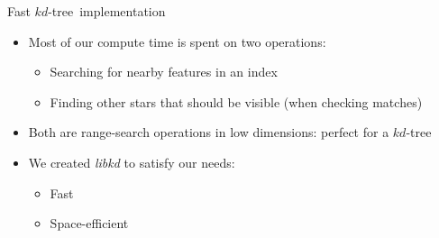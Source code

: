 \documentclass[compress]{beamer}
\newcommand{\libkd}{\emph{libkd}\xspace}
\newcommand{\kdtree}{$kd$-tree}
\begin{document}
\begin{frame}{Fast \kdtree\  implementation}
\begin{itemize}
    \addtolength{\itemsep}{0.5ex}
\item Most of our compute time is spent on \alert{two operations}:
  \begin{itemize}
    \addtolength{\itemsep}{0.5ex}
    \addtolength{\topsep}{0.5ex}
  \item Searching for \alert{nearby features} in an index
  \item Finding other stars that should be visible (when checking
    matches)
  \end{itemize}
\item Both are \alert{range-search} operations in low dimensions: perfect
  for a \kdtree
\item We created \alert{\libkd} to satisfy our needs:
  \begin{itemize}
    \addtolength{\itemsep}{0.5ex}
    \addtolength{\topsep}{0.5ex}
  \item Fast
  \item Space-efficient
  \end{itemize}
\end{itemize}
\end{frame}

\newcommand{\ftt}[1]{\tt #1}
\newcommand{\sg}[1]{{\small\color[rgb]{0.5,0.5,0.5}{#1}}}
\newcommand{\libkdmem}[3]{\multicolumn{2}{c|}{%
    \makebox[\widthof{\sg{120+}}][r]{\sg{#1+}}%
    \makebox[\widthof{\sg{52}}][r]{\sg{#2}} = %
    \makebox[\widthof{172}][r]{#3}}}
\newcommand{\compmem}[3]{\multicolumn{1}{c|}{%
    \makebox[\widthof{\sg{120+}}][r]{\sg{#1+}}%
    \makebox[\widthof{\sg{250}}][r]{\sg{#2}} = %
    \makebox[\widthof{370}][r]{#3}}}
\newcommand{\minitab}[2][l]{\begin{tabular}{#1}#2\end{tabular}}
\end{document}
